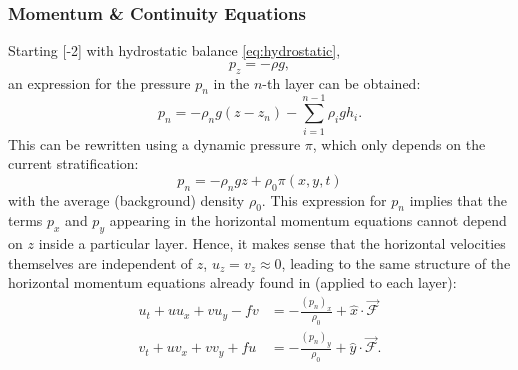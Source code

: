 \subsubsection{Momentum \& Continuity Equations}
Starting %
[-2]%
with hydrostatic balance \eqref{eq:hydrostatic}, \ie
%
\begin{equation}
p_z = -\rho g,
\end{equation}
%
an expression for the pressure \(p_n\) in the \(n\)-th layer can be obtained:
%
\begin{equation}
p_n = -\rho_n g (z - z_n) - \sum_{i=1}^{n-1} \rho_i g h_i. \label{eq:pres-layer}
\end{equation}
%
This can be rewritten using a dynamic pressure \(\pi\), which only depends on the current stratification:
%
\begin{equation}
p_n = -\rho_n g z + \rho_0 \pi(x,y,t)
\end{equation}
%
with the average (background) density \(\rho_0\).
This expression for \(p_n\) implies that the terms \(p_x\) and \(p_y\) appearing in the horizontal momentum equations cannot depend on \(z\) inside a particular layer. Hence, it makes sense that the horizontal velocities themselves are independent of \(z\), \ie \(u_z = v_z \approx 0\), leading to the same structure of the horizontal momentum equations already found in  (applied to each layer):
%
\begin{align}
u_t + uu_x + vu_y - fv &= -\frac{(p_n)_x}{\rho_0} + \hat{x} \cdot \vec{\mathcal{F}} \\
v_t + uv_x + vv_y + fu &= - \frac{(p_n)_y}{\rho_0} + \hat{y} \cdot \vec{\mathcal{F}}.
\end{align}

